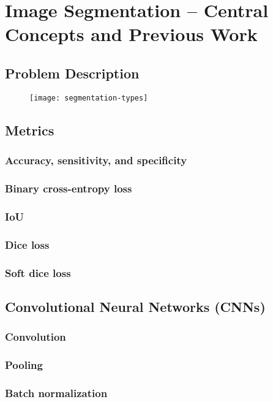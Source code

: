 \section{Image Segmentation -- Central Concepts and Previous Work}



\subsection{Problem Description}

\begin{figure}[htb]
  \texttt{[image: segmentation-types]}
\end{figure}

\subsection{Metrics}
  \subsubsection{Accuracy, sensitivity, and specificity}
  \subsubsection{Binary cross-entropy loss}
  \subsubsection{IoU}
  \subsubsection{Dice loss}
  \subsubsection{Soft dice loss}

\subsection{Convolutional Neural Networks (CNNs)}
  \subsubsection{Convolution}
  \subsubsection{Pooling}
  \subsubsection{Batch normalization}

